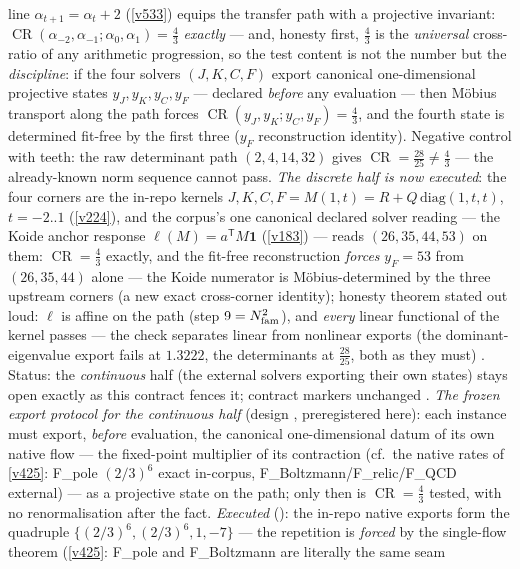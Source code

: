 line $\alpha_{t+1}=\alpha_t+2$ (\vref{v533}) equips the transfer path with a projective invariant:
$\operatorname{CR}(\alpha_{-2},\alpha_{-1};\alpha_0,\alpha_1)=\tfrac43$ \emph{exactly} --- and,
honesty first, $\tfrac43$ is the \emph{universal} cross-ratio of any arithmetic progression, so the
test content is not the number but the \emph{discipline}: if the four solvers $(J,K,C,F)$ export
canonical one-dimensional projective states $y_J,y_K,y_C,y_F$ --- declared \emph{before} any
evaluation --- then M\"obius transport along the path forces
$\operatorname{CR}(y_J,y_K;y_C,y_F)=\tfrac43$, and the fourth state is determined fit-free by the
first three ($y_F$ reconstruction identity).  Negative control with teeth: the raw determinant path
$(2,4,14,32)$ gives $\operatorname{CR}=\tfrac{28}{25}\neq\tfrac43$ --- the already-known norm
sequence cannot pass.  \emph{The discrete half is now executed}: the four corners are the in-repo
kernels $J,K,C,F=M(1,t)=R+Q\,\mathrm{diag}(1,t,t)$, $t=-2..1$ (\vref{v224}), and the corpus's one
canonical declared solver reading --- the Koide anchor response $\ell(M)=a^{\mathsf T}M\mathbf 1$
(\vref{v183}) --- reads $(26,35,44,53)$ on them: $\operatorname{CR}=\tfrac43$ exactly, and the
fit-free reconstruction \emph{forces} $y_F=53$ from $(26,35,44)$ alone --- the Koide numerator is
M\"obius-determined by the three upstream corners (a new exact cross-corner identity); honesty
theorem stated out loud: $\ell$ is affine on the path (step $9=N_{\mathrm{fam}}^2$), and \emph{every} linear
functional of the kernel passes --- the check separates linear from nonlinear exports (the
dominant-eigenvalue export fails at $1.3222$, the determinants at $\tfrac{28}{25}$, both as they
must) \mE.  Status: the \emph{continuous} half (the external solvers exporting their own states)
stays open exactly as this contract fences it; contract markers unchanged \mC.  \emph{The frozen
export protocol for the continuous half} (design \mX, preregistered here): each instance must
export, \emph{before} evaluation, the canonical one-dimensional datum of its own native flow ---
the fixed-point multiplier of its contraction (cf.\ the native rates of \vref{v425}: F\_pole
$(2/3)^6$ exact in-corpus, F\_Boltzmann/F\_relic/F\_QCD external) --- as a projective state on
the path; only then is $\operatorname{CR}=\tfrac43$ tested, with no renormalisation after the
fact.  \emph{Executed} (): the in-repo native exports
form the quadruple $\{(2/3)^6,(2/3)^6,1,-7\}$ --- the repetition is \emph{forced} by the
single-flow theorem (\vref{v425}: F\_pole and F\_Boltzmann are literally the same seam
